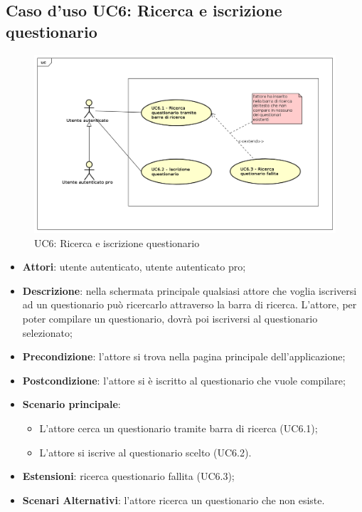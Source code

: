 \newpage
\subsection{Caso d'uso UC6: Ricerca e iscrizione questionario}
\label{UC6}
\begin{figure}[h]
\centering
\includegraphics[scale=0.5,keepaspectratio]{UML/UC6.png}
\caption{UC6: Ricerca e iscrizione questionario}
\end{figure}
\FloatBarrier
\begin{itemize}
\item\textbf{Attori}: utente autenticato, utente autenticato pro;
\item\textbf{Descrizione}: nella schermata principale qualsiasi attore che voglia iscriversi ad un questionario può ricercarlo attraverso la barra di ricerca. L'attore, per poter compilare un questionario, dovrà poi iscriversi al questionario selezionato;	
\item\textbf{Precondizione}: l'attore si trova nella pagina principale dell'applicazione;
\item\textbf{Postcondizione}: l'attore si è iscritto al questionario che vuole compilare;
\item\textbf{Scenario principale}:
\begin{itemize}
\item L'attore cerca un questionario tramite barra di ricerca (UC6.1);
\item L'attore si iscrive al questionario scelto (UC6.2).
\end{itemize}
\item\textbf{Estensioni}: ricerca questionario fallita (UC6.3);
\item\textbf{Scenari Alternativi}: l'attore ricerca un questionario che non esiste. 
\end{itemize}

